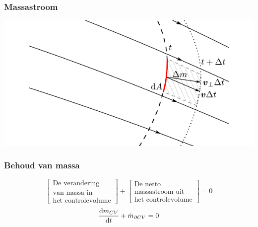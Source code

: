 \documentclass[t]{beamer}
\begin{document}
	\begin{frame}
		\frametitle{Massastroom}
		\vspace{1cm}
		\center
		\includegraphics{../fig/controlevolumes/massastroom}
  	\end{frame}
	\begin{frame}
		\frametitle{Behoud van massa}
		\vspace{1cm}
		\begin{equation*}
			\left[
				\begin{array}{c}
					\mbox{De verandering} \\ \mbox{van massa in} \\ \mbox{het controlevolume}
				\end{array}
			\right]
			+
			\left[
				\begin{array}{c}
					\mbox{De netto} \\ \mbox{massastroom uit} \\ \mbox{het controlevolume}
				\end{array}
			\right]
			= 0
			\label{eqn:controlevolume,behoud van massa,woorden}
		\end{equation*}
		\vspace{1cm}
		\pause
		\begin{equation}
			\frac{\mathrm{d} m_{CV}}{\mathrm{d} t} + \dot{m}_{\partial CV} = 0
			\label{eqn:controlevolume,behoud van massa}
		\end{equation}
	\end{frame}	
\end{document}
